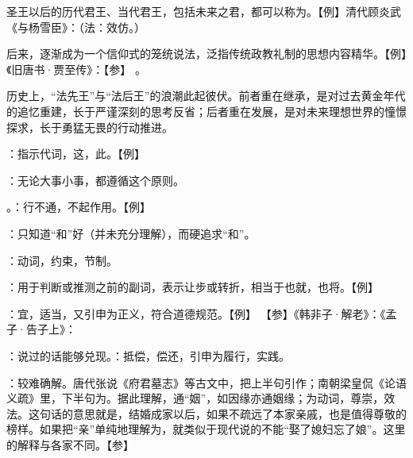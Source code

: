 {圣王以后的历代君王、当代君王，包括未来之君，都可以称为。【例】清代顾炎武《与杨雪臣》：（法：效仿。）

后来，逐渐成为一个信仰式的笼统说法，泛指传统政教礼制的思想内容精华。【例】《旧唐书·贾至传》：【参】 。

历史上，“法先王”与“法后王”的浪潮此起彼伏。前者重在继承，是对过去黄金年代的追忆重建，长于严谨深刻的思考反省；后者重在发展，是对未来理想世界的憧憬探求，长于勇猛无畏的行动推进。

\item {}：指示代词，这，此。【例】 
\item {}：无论大事小事，都遵循这个原则。
\item {}。：行不通，不起作用。【例】 

：只知道“和”好（并未充分理解），而硬追求“和”。

：动词，约束，节制。

：用于判断或推测之前的副词，表示让步或转折，相当于也就，也将。【例】   
}
{}


{
\item {}：宜，适当，又引申为正义，符合道德规范。【例】 【参】《韩非子·解老》：《孟子·告子上》：
\item {}：说过的话能够兑现。：抵偿，偿还，引申为履行，实践。

\item {}：较难确解。唐代张说《府君墓志》等古文中，把上半句引作；南朝梁皇侃《论语义疏》里，下半句为。据此理解，通“姻”，如因缘亦通姻缘；为动词，尊崇，效法。这句话的意思就是，结婚成家以后，如果不疏远了本家亲戚，也是值得尊敬的榜样。如果把“亲”单纯地理解为，就类似于现代说的不能“娶了媳妇忘了娘”。这里的解释与各家不同。【参】
}
{}


